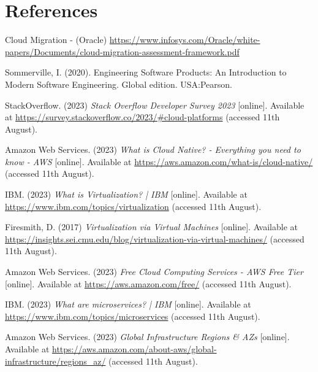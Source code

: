 \section{References}

Cloud Migration
  - (Oracle) \url{https://www.infosys.com/Oracle/white-papers/Documents/cloud-migration-assessment-framework.pdf}


 \noindent [1] Sommerville, I. (2020). Engineering Software Products: An Introduction to Modern Software Engineering. Global edition. USA:Pearson.
 \vspace{0.2cm}

 \noindent [2] StackOverflow. (2023) \textit{Stack Overflow Developer Survey 2023} [online]. Available at \url{https://survey.stackoverflow.co/2023/#cloud-platforms} (accessed 11th August).
 \vspace{0.2cm}

 \noindent [3] Amazon Web Services. (2023) \textit{What is Cloud Native? - Everything you need to know - AWS} [online]. Available at \url{https://aws.amazon.com/what-is/cloud-native/} (accessed 11th August).
 \vspace{0.2cm}

 \noindent [4] IBM. (2023) \textit{What is Virtualization? | IBM} [online]. Available at \url{https://www.ibm.com/topics/virtualization} (accessed 11th August).
 \vspace{0.2cm}

 \noindent [5] Firesmith, D. (2017) \textit{Virtualization via Virtual Machines} [online]. Available at \url{https://insights.sei.cmu.edu/blog/virtualization-via-virtual-machines/} (accessed 11th August).
 \vspace{0.2cm}

 \noindent [6] Amazon Web Services. (2023) \textit{Free Cloud Computing Services - AWS Free Tier} [online]. Available at \url{https://aws.amazon.com/free/} (accessed 11th August).
 \vspace{0.2cm}

 \noindent [7] IBM. (2023) \textit{What are microservices? | IBM} [online]. Available at \url{https://www.ibm.com/topics/microservices} (accessed 11th August).
 \vspace{0.2cm}

 \noindent [8] Amazon Web Services. (2023) \textit{Global Infrastructure Regions \& AZs} [online]. Available at \url{https://aws.amazon.com/about-aws/global-infrastructure/regions_az/} (accessed 11th August).
 \vspace{0.2cm}


